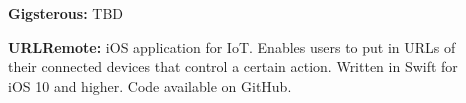 
\begin{description}
    \item[]{\bf Gigsterous:}
    { \footnotesize TBD}
    \item[]{\bf URLRemote:}
    { \footnotesize iOS application for IoT. Enables users to put in URLs of their connected devices that control a certain action. Written in Swift for iOS 10 and higher. Code available on GitHub.}
\end{description}